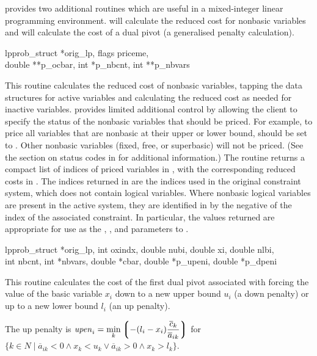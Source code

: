 \dylp provides two additional routines which are useful in a mixed-integer
linear programming environment.
 will calculate the reduced cost for nonbasic variables
and  will calculate the cost of a dual pivot
(a generalised penalty calculation).

\begin{subrdoc}
  \item
	  {lpprob_struct *orig_lp, flags priceme, \\
	   double **p_ocbar, int *p_nbcnt, int **p_nbvars}
  
  This routine calculates the reduced cost of nonbasic variables, tapping
  the \dylp data structures for active variables and calculating the reduced
  cost as needed for inactive variables.
   provides limited additional control by allowing the client
  to specify the status of the nonbasic variables that should be priced.
  For example, to price all variables that are nonbasic at their upper or
  lower bound,
   should be set to .
  Other nonbasic variables (fixed, free, or superbasic) will not be priced.
  (See the section on status codes in  for additional
  information.)
  The routine returns a compact list of  indices of priced
  variables in , with the corresponding reduced costs in
  .
  The indices returned in  are the indices used in the original
  constraint system, which does not contain logical variables.
  Where nonbasic logical variables are present in the active system, they are
  identified in  by the negative of the index of the
  associated constraint.
  In particular, the values returned are appropriate for use as
  the ,
  , and  parameters to .

  \item
	  {lpprob_struct *orig_lp, int oxindx,
	   double nubi, double xi, double nlbi, \\
	   int nbcnt, int *nbvars,
	   double *cbar, double *p_upeni, double *p_dpeni}
  
  This routine calculates the cost of the first dual pivot associated with
  forcing the value of the basic variable $x_i$ 
  down to a new upper bound $u_i$ (a down penalty) or up to a new
  lower bound $l_i$ (an up penalty).
  
  The up penalty is
  $\displaystyle \mathit{upen}_i = \min_k \left\lgroup -(l_i - x_i)
		\frac{\overline{c}_k}{\overline{a}_{ik}} \right\rgroup$
  for $\{k \in N \mid \overline{a}_{ik} < 0 \wedge x_k < u_k \vee
		   \overline{a}_{ik} > 0 \wedge x_k > l_k\}$.


\end{subrdoc}
